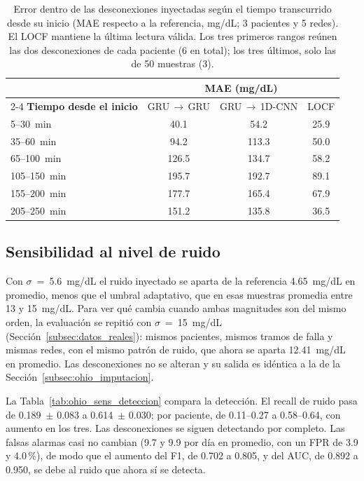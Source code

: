 \documentclass{report}
\begin{document}
\begin{table}[!htb]
\centering
\footnotesize
\setlength{\tabcolsep}{6pt}
\caption{Error dentro de las desconexiones inyectadas según el tiempo transcurrido desde su inicio (MAE respecto a la referencia, mg/dL; 3 pacientes y 5 redes). El LOCF mantiene la última lectura válida. Los tres primeros rangos reúnen las dos desconexiones de cada paciente (6 en total); los tres últimos, solo las de 50 muestras (3).}
\label{tab:ohio_error_tiempo}
\begin{tabular}{lccc}
\toprule
& \multicolumn{3}{c}{\textbf{MAE (mg/dL)}} \\
\cmidrule(lr){2-4}
\textbf{Tiempo desde el inicio} & GRU\,$\rightarrow$\,GRU & GRU\,$\rightarrow$\,1D-CNN & LOCF \\
\midrule
5--30~min    & 40.1  & 54.2  & 25.9 \\
35--60~min   & 94.2  & 113.3 & 50.0 \\
65--100~min  & 126.5 & 134.7 & 58.2 \\
105--150~min & 195.7 & 192.7 & 89.1 \\
155--200~min & 177.7 & 165.4 & 67.9 \\
205--250~min & 151.2 & 135.8 & 36.5 \\
\bottomrule
\end{tabular}
\end{table}


\subsection{Sensibilidad al nivel de ruido}
\label{subsec:ohio_sensibilidad}
 
Con $\sigma$~=~5.6~mg/dL el ruido inyectado se aparta de la referencia 4.65~mg/dL en promedio, menos que el umbral adaptativo, que en esas muestras promedia entre 13 y 15~mg/dL. Para ver qué cambia cuando ambas magnitudes son del mismo orden, la evaluación se repitió con $\sigma$~=~15~mg/dL (Sección~\ref{subsec:datos_reales}): mismos pacientes, mismos tramos de falla y mismas redes, con el mismo patrón de ruido, que ahora se aparta 12.41~mg/dL en promedio. Las desconexiones no se alteran y su salida es idéntica a la de la Sección~\ref{subsec:ohio_imputacion}.
 
La Tabla~\ref{tab:ohio_sens_deteccion} compara la detección. El recall de ruido pasa de 0.189~$\pm$ 0.083 a 0.614~$\pm$ 0.030; por paciente, de 0.11--0.27 a 0.58--0.64, con aumento en los tres. Las desconexiones se siguen detectando por completo. Las falsas alarmas casi no cambian (9.7 y 9.9 por día en promedio, con un FPR de 3.9 y 4.0\,\%), de modo que el aumento del F1, de 0.702 a 0.805, y del AUC, de 0.892 a 0.950, se debe al ruido que ahora sí se detecta.
 
\end{document}
